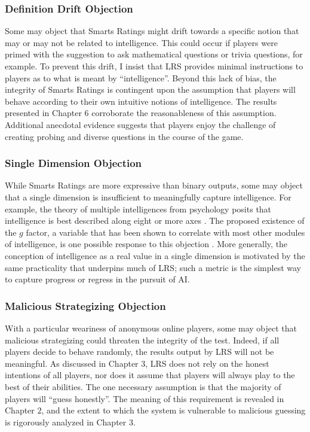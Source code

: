 \subsubsection{Definition Drift Objection}

Some may object that Smarts Ratings might drift towards a specific notion that may or may not be related to intelligence. This could occur if players were primed with the suggestion to ask mathematical questions or trivia questions, for example. To prevent this drift, I insist that LRS provides minimal instructions to players as to what is meant by ``intelligence''. Beyond this lack of bias, the integrity of Smarts Ratings is contingent upon the assumption that players will behave according to their own intuitive notions of intelligence. The results presented in Chapter $6$ corroborate the reasonableness of this assumption. Additional anecdotal evidence suggests that players enjoy the challenge of creating probing and diverse questions in the course of the game.

\subsubsection{Single Dimension Objection}

While Smarts Ratings are more expressive than binary outputs, some may object that a single dimension is insufficient to meaningfully capture intelligence. For example, the theory of multiple intelligences from psychology posits that intelligence is best described along eight or more axes \citep{gardner2011frames}. The proposed existence of the $g$ factor, a variable that has been shown to correlate with most other modules of intelligence, is one possible response to this objection \citep{visser2006g}. More generally, the conception of intelligence as a real value in a single dimension is motivated by the same practicality that underpins much of LRS; such a metric is the simplest way to capture progress or regress in the pursuit of AI.

\subsubsection{Malicious Strategizing Objection}

With a particular weariness of anonymous online players, some may object that malicious strategizing could threaten the integrity of the test. Indeed, if all players decide to behave randomly, the results output by LRS will not be meaningful. As discussed in Chapter $3$, LRS does not rely on the honest intentions of all players, nor does it assume that players will always play to the best of their abilities. The one necessary assumption is that the majority of players will ``guess honestly''. The meaning of this requirement is revealed in Chapter $2$, and the extent to which the system is vulnerable to malicious guessing is rigorously analyzed in Chapter $3$.

